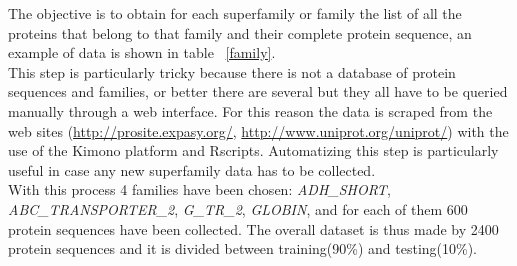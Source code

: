 \documentclass[a4paper, 10pt, conference]{ieeeconf}      %
\begin{document}
	The objective is to obtain for each superfamily or family the list of all the proteins that belong to that family and their complete protein sequence, an example of data is shown in table ~\ref{family}.\\
	This step is particularly tricky because there is not a database of protein sequences and families, or better there are several but they all have to be queried manually through a web interface. For this reason the data is scraped from the web sites (\href{http://prosite.expasy.org/}{http://prosite.expasy.org/}, \href{http://www.uniprot.org/uniprot/}{http://www.uniprot.org/uniprot/}) with the use of the Kimono platform\cite{kimono} and Rscripts. Automatizing this step is particularly useful in case any new superfamily data has to be collected.\\
	With this process 4 families have been chosen: \textit{ADH\_SHORT},\textit{ ABC\_TRANSPORTER\_2}, \textit{G\_TR\_2}, \textit{GLOBIN}, and for each of them 600 protein sequences have been collected. The overall dataset is thus made by 2400 protein sequences and it is divided between training(90\%) and testing(10\%).
	
\end{document}

